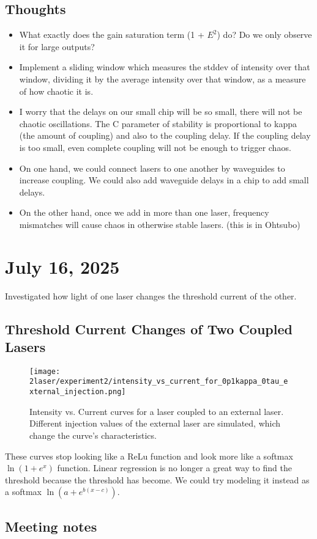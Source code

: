 \documentclass[11pt,letterpaper]{article}
\begin{document}
\subsection{Thoughts}
\begin{itemize}
    \item What exactly does the gain saturation term (1 + $E^2$) do? Do we only observe it for large outputs?
    \item Implement a sliding window which measures the stddev of intensity over that window, dividing it by the average intensity over that window, as a measure of how chaotic it is.
    \item I worry that the delays on our small chip will be so small, there will not be chaotic oscillations. The C parameter of stability is proportional to kappa (the amount of coupling) and also to the coupling delay. If the coupling delay is too small, even complete coupling will not be enough to trigger chaos.
    \item On one hand, we could connect lasers to one another by waveguides to increase coupling. We could also add waveguide delays in a chip to add small delays.
    \item On the other hand, once we add in more than one laser, frequency mismatches will cause chaos in otherwise stable lasers. (this is in Ohtsubo)
\end{itemize}

\section{July 16, 2025}
Investigated how light of one laser changes the threshold current of the other.

\subsection{Threshold Current Changes of Two Coupled Lasers}

\begin{figure}[H]
\centering
\texttt{[image: 2laser/experiment2/intensity\_vs\_current\_for\_0p1kappa\_0tau\_external\_injection.png]}
\caption{Intensity vs. Current curves for a laser coupled to an external laser. Different injection values of the external laser are simulated, which change the curve's characteristics. \label{intensityvcurrentexternalinjection}}
\end{figure}

These curves stop looking like a ReLu function and look more like a softmax $\ln (1 + e^x)$ function. Linear regression is no longer a great way to find the threshold because the threshold has become. We could try modeling it instead as a softmax $\ln (a + e^{b(x-c)})$.

\subsection{Meeting notes}

 
\end{document}
